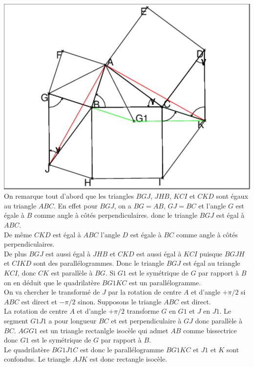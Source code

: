 \documentclass[a4paper,11pt]{book}
\begin{document}
\includegraphics[width=\textwidth]{rectiso0}
On remarque tout d'abord que les triangles $BGJ$, $JHB$, $KCI$ et $CKD$ sont 
\'egaux au triangle $ABC$. En effet pour $BGJ$, on a $BG=AB$, $GJ=BC$ et 
l'angle $G$ est \'egale \`a $B$ comme angle \`a c\^ot\'es perpendiculaires.
donc le triangle $BGJ$ est \'egal \`a $ABC$.\\ 
De m\^eme $CKD$ est \'egal \`a $ABC$ l'angle $D$ est \'egale \`a $BC$ comme 
angle \`a c\^ot\'es perpendiculaires.\\
De plus $BGJ$ est aussi \'egal \`a $JHB$ et $CKD$  est aussi \'egal \`a $KCI$
puisque $BGJH$ et $CIKD$ sont des parall\'elogrammes.
Donc le triangle $BGJ$ est \'egal au triangle $KCI$, donc $CK$ est parall\`ele 
\`a $BG$. Si $G1$ est le sym\'etrique de $G$ par rapport \`a $B$ on en d\'eduit que le quadrilat\`ere $BG1KC$ est un parall\'elogramme.\\
On va chercher le transform\'e de $J$ par la rotation de centre $A$ et d'angle 
$+\pi/2$ si $ABC$ est direct et $-\pi/2$ sinon.
Supposons le triangle $ABC$ est direct.\\
La rotation de centre $A$ et d'angle $+\pi/2$ transforme $G$ en $G1$ et $J$ en 
$J1$. Le segment $G1J1$ a pour longueur $BC$ et est perpendiculaire \`a $GJ$ 
donc parall\`ele \`a $BC$.
$AGG1$ est un triangle rectanlgle isoc\`ele qui admet $AB$ comme bissectrice 
donc $G1$ est le sym\'etrique de $G$ par rapport \`a $B$.\\
Le quadrilat\`ere $BG1J1C$ est donc le parall\'elogramme $BG1KC$ et $J1$ et $K$
 sont confondus. Le triangle $AJK$ est donc rectangle isoc\`ele.
\end{document}
